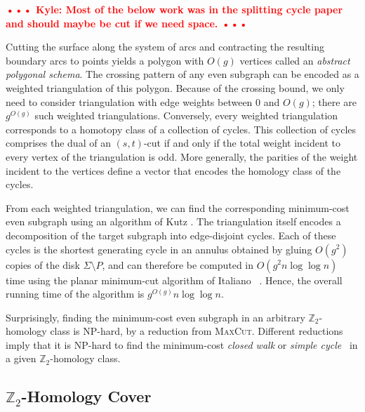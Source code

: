 \documentclass[natbib]{svcyclop}
\def\NOTE#1{\textcolor{Red}{\textbf{\textsf{••• #1 •••}}}}
\def\Z{\mathbb{Z}}
\begin{document}
\NOTE{Kyle: Most of the below work was in the splitting cycle paper and should maybe be cut if we need space.}

Cutting the surface along the system of arcs and contracting the resulting boundary arcs to points yields a polygon with $O(g)$ vertices called an \emph{abstract polygonal schema}.
The crossing pattern of any even subgraph can be encoded as a weighted triangulation of this polygon.  Because of the crossing bound, we only need to consider triangulation with edge weights between $0$ and $O(g)$; there are $g^{O(g)}$ such weighted triangulations.
Conversely, every weighted triangulation corresponds to a homotopy class of a collection of cycles.  This collection of cycles comprises the dual of an $(s,t)$-cut if and only if the total weight incident to every vertex of the triangulation is odd.  More generally, the parities of the weight incident to the vertices define a vector that encodes the homology class of the cycles.

From each weighted triangulation, we can find the corresponding minimum-cost even subgraph using an algorithm of Kutz \cite{k-csnco-06}.  The triangulation itself encodes a decomposition of the target subgraph into edge-disjoint cycles.  Each of these cycles is the shortest generating cycle in an annulus obtained by gluing $O(g^2)$ copies of the disk $\Sigma\setminus P$, and can therefore be computed in $O(g^2n\log\log n)$ time using the planar minimum-cut algorithm of Italiano \etal~\cite{insw-iamcmf-11}.
Hence, the overall running time of the algorithm is $g^{O(g)}n\log\log n$.

Surprisingly, finding the minimum-cost even subgraph in an arbitrary $\Z_2$-homology class is NP-hard, by a reduction from \textsc{MaxCut}.  Different reductions imply that it is NP-hard to find the minimum-cost \emph{closed walk} \cite{ccelw-scsih-08} or \emph{simple cycle}~\cite{c-fscss-10} in a given $\Z_2$-homology class.

\subsection{$\Z_2$-Homology Cover}
\end{document}
